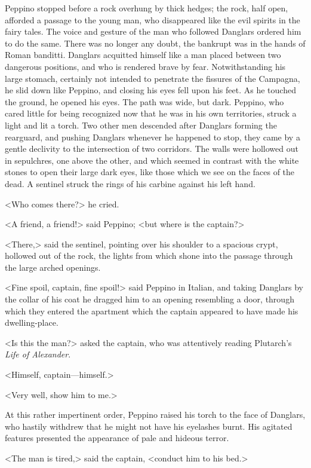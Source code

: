  Peppino stopped before a rock overhung by thick hedges; the rock, half open, afforded a passage to the young man, who disappeared like the evil spirits in the fairy tales. The voice and gesture of the man who followed Danglars ordered him to do the same. There was no longer any doubt, the bankrupt was in the hands of Roman banditti. Danglars acquitted himself like a man placed between two dangerous positions, and who is rendered brave by fear. Notwithstanding his large stomach, certainly not intended to penetrate the fissures of the Campagna, he slid down like Peppino, and closing his eyes fell upon his feet. As he touched the ground, he opened his eyes.  The path was wide, but dark. Peppino, who cared little for being recognized now that he was in his own territories, struck a light and lit a torch. Two other men descended after Danglars forming the rearguard, and pushing Danglars whenever he happened to stop, they came by a gentle declivity to the intersection of two corridors. The walls were hollowed out in sepulchres, one above the other, and which seemed in contrast with the white stones to open their large dark eyes, like those which we see on the faces of the dead. A sentinel struck the rings of his carbine against his left hand. 

 <Who comes there?> he cried. 

 <A friend, a friend!> said Peppino; <but where is the captain?> 

 <There,> said the sentinel, pointing over his shoulder to a spacious crypt, hollowed out of the rock, the lights from which shone into the passage through the large arched openings. 

 <Fine spoil, captain, fine spoil!> said Peppino in Italian, and taking Danglars by the collar of his coat he dragged him to an opening resembling a door, through which they entered the apartment which the captain appeared to have made his dwelling-place. 

 <Is this the man?> asked the captain, who was attentively reading Plutarch's \textit{Life of Alexander}. 

 <Himself, captain—himself.> 

 <Very well, show him to me.> 

 At this rather impertinent order, Peppino raised his torch to the face of Danglars, who hastily withdrew that he might not have his eyelashes burnt. His agitated features presented the appearance of pale and hideous terror. 

 <The man is tired,> said the captain, <conduct him to his bed.> 

